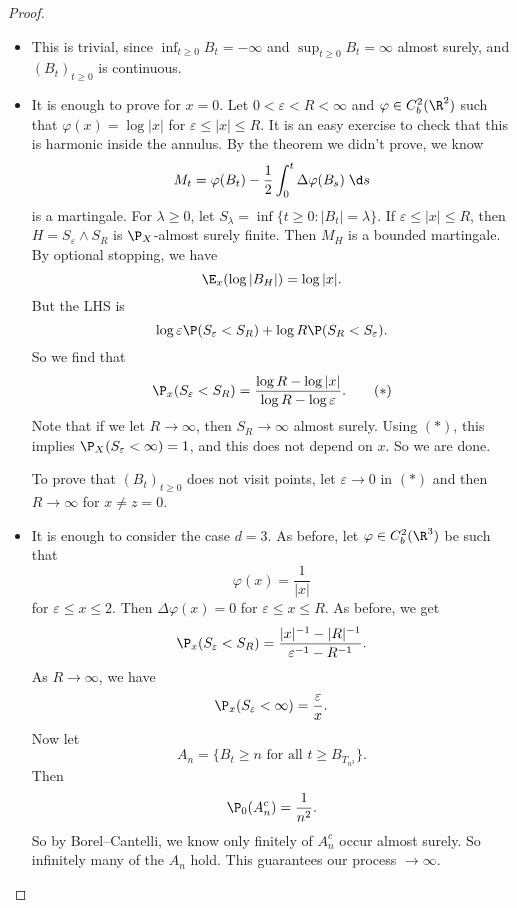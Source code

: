\documentclass[a4paper]{article}
\begin{document}
\begin{proof}\leavevmode
  \begin{itemize}
    \item This is trivial, since $\inf_{t \geq 0} B_t = -\infty$ and $\sup_{t \geq 0} B_t = \infty$ almost surely, and $(B_t)_{t \geq 0}$ is continuous.
    \item It is enough to prove for $x = 0$. Let $0 < \varepsilon < R < \infty$ and $\varphi \in C_b^2(\R^2)$ such that $\varphi(x) = \log |x|$ for $\varepsilon \leq |x| \leq R$. It is an easy exercise to check that this is harmonic inside the annulus. By the theorem we didn't prove, we know
      \[
        M_t = \varphi(B_t) - \frac{1}{2} \int_0^t \Delta \varphi (B_s)\;\d s
      \]
      is a martingale. For $\lambda \geq 0$, let $S_\lambda = \inf \{t \geq 0: |B_t| = \lambda\}$. If $\varepsilon \leq |x| \leq R$, then $H = S_\varepsilon \wedge S_R$ is $\P_X$-almost surely finite. Then $M_H$ is a bounded martingale. By optional stopping, we have
      \[
        \E_x (\log |B_H|) = \log |x|.
      \]
      But the LHS is
      \[
        \log \varepsilon \P(S_\varepsilon < S_R) + \log R \P(S_R < S_\varepsilon).
      \]
      So we find that
      \[
        \P_x(S_\varepsilon < S_R) = \frac{\log R - \log |x|}{\log R - \log \varepsilon}.\tag{$*$}
      \]
      Note that if we let $R \to \infty$, then $S_R \to \infty$ almost surely. Using $(*)$, this implies $\P_X(S_\varepsilon < \infty) = 1$, and this does not depend on $x$. So we are done.

      To prove that $(B_t)_{t \geq 0}$ does not visit points, let $\varepsilon \to 0$ in $(*)$ and then $R \to \infty$ for $x \not= z = 0$.
    \item It is enough to consider the case $d = 3$. As before, let $\varphi \in C_b^2(\R^3)$ be such that
      \[
        \varphi(x) = \frac{1}{|x|}
      \]
      for $\varepsilon \leq x \leq 2$. Then $\Delta \varphi(x) = 0$ for $\varepsilon \leq x \leq R$. As before, we get
      \[
        \P_x(S_\varepsilon < S_R) = \frac{|x|^{-1} - |R|^{-1}}{\varepsilon^{-1} - R^{-1}}.
      \]
      As $R \to \infty$, we have
      \[
        \P_x(S_\varepsilon < \infty) = \frac{\varepsilon}{x}.
      \]
      Now let
      \[
        A_n = \{B_t \geq n\text{ for all }t \geq B_{T_{n^3}}\}.
      \]
      Then
      \[
        \P_0(A_n^c) = \frac{1}{n^2}.
      \]
      So by Borel--Cantelli, we know only finitely of $A_n^c$ occur almost surely. So infinitely many of the $A_n$ hold. This guarantees our process $\to \infty$. \qedhere %
  \end{itemize}
\end{proof}
\end{document}
